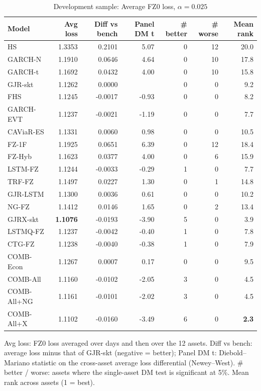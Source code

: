 \begin{table}[htbp]
\centering
\footnotesize
\caption{Development sample: Average FZ0 loss, $\alpha=0.025$}
\label{tab:dev_loss_a025}
\begin{tabular}{lrrrrrr}
\toprule
Model & Avg loss & Diff vs bench & Panel DM t & \# better & \# worse & Mean rank \\
\midrule
HS & 1.3353 & 0.2101 & 5.07 & 0 & 12 & 20.0 \\
GARCH-N & 1.1910 & 0.0646 & 4.64 & 0 & 10 & 17.8 \\
GARCH-t & 1.1692 & 0.0432 & 4.00 & 0 & 10 & 15.8 \\
GJR-skt & 1.1262 & 0.0000 &  & 0 & 0 & 9.2 \\
FHS & 1.1245 & -0.0017 & -0.93 & 0 & 0 & 8.2 \\
GARCH-EVT & 1.1237 & -0.0021 & -1.19 & 0 & 0 & 7.7 \\
CAViaR-ES & 1.1331 & 0.0060 & 0.98 & 0 & 0 & 10.5 \\
FZ-1F & 1.1925 & 0.0651 & 6.39 & 0 & 12 & 18.4 \\
FZ-Hyb & 1.1623 & 0.0377 & 4.00 & 0 & 6 & 15.9 \\
LSTM-FZ & 1.1244 & -0.0033 & -0.29 & 1 & 0 & 7.7 \\
TRF-FZ & 1.1497 & 0.0227 & 1.30 & 0 & 1 & 14.8 \\
GJR-LSTM & 1.1300 & 0.0036 & 0.61 & 0 & 0 & 10.2 \\
NG-FZ & 1.1412 & 0.0146 & 1.65 & 0 & 2 & 13.4 \\
GJRX-skt & \textbf{1.1076} & -0.0193 & -3.90 & 5 & 0 & 3.9 \\
LSTMQ-FZ & 1.1237 & -0.0042 & -0.40 & 1 & 0 & 7.8 \\
CTG-FZ & 1.1238 & -0.0040 & -0.38 & 1 & 0 & 7.9 \\
COMB-Econ & 1.1267 & 0.0007 & 0.17 & 0 & 0 & 9.5 \\
COMB-All & 1.1160 & -0.0102 & -2.05 & 3 & 0 & 4.5 \\
COMB-All+NG & 1.1161 & -0.0101 & -2.02 & 3 & 0 & 4.5 \\
COMB-All+X & 1.1102 & -0.0160 & -3.49 & 6 & 0 & \textbf{2.3} \\
\bottomrule
\end{tabular}
\par\smallskip\parbox{\linewidth}{\scriptsize Avg loss: FZ0 loss averaged over days and then over the 12 assets. Diff vs bench: average loss minus that of GJR-skt (negative = better); Panel DM t: Diebold--Mariano statistic on the cross-asset average loss differential (Newey--West). \# better / worse: assets where the single-asset DM test is significant at 5\%. Mean rank across assets (1 = best).}
\end{table}